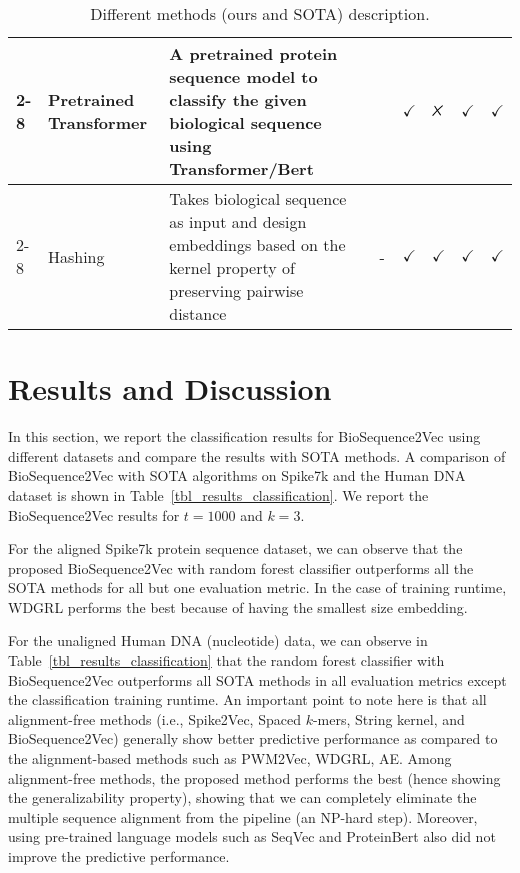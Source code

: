 \documentclass[runningheads]{llncs}
\newcommand{\tikzxmark}{%
\tikz[scale=0.23] {
    \draw[line width=0.7,line cap=round] (0,0) to [bend left=6] (1,1);
    \draw[line width=0.7,line cap=round] (0.2,0.95) to [bend right=3] (0.8,0.05);
}}
\begin{document}
\begin{table}[h!]
{\begin{tabular}{p{2.5cm}p{2cm}p{5cm}cp{1.6cm}p{2.5cm}p{1.2cm}p{1.7cm}}
    \cmidrule{2-8}
    \multirow{4}{*}{ProteinBERT} & \multirow{4}{2cm}{Pretrained Transformer} & A pretrained protein sequence model to classify the given biological sequence using Transformer/Bert & \multirow{4}{*}{~\cite{brandes2022proteinbert}} & \multirow{4}{*}{$\checkmark$} & \multirow{4}{*}{$\tikzxmark$} & \multirow{4}{*}{$\checkmark$}  & \multirow{4}{*}{$\checkmark$} \\
    \cmidrule{2-8}
    \multirow{4}{2cm}{BioSequence2Vec (ours)} & \multirow{4}{2cm}{Hashing} & Takes biological sequence as input and design embeddings based on the kernel property of preserving pairwise distance & \multirow{4}{*}{-} & \multirow{4}{*}{$\checkmark$} & \multirow{4}{*}{$\checkmark$} & \multirow{4}{*}{$\checkmark$}  & \multirow{4}{*}{$\checkmark$} \\
      \bottomrule
    \end{tabular}
    }
    \caption{Different methods (ours and SOTA) description.}
    \label{tbl_sota_detail}
\end{table}


\section{Results and Discussion}\label{sec_results}
In this section, we report the classification results for BioSequence2Vec using different datasets and compare the results with SOTA methods.
A comparison of BioSequence2Vec with SOTA algorithms on Spike7k and the Human DNA dataset is shown in Table~\ref{tbl_results_classification}. We report the BioSequence2Vec results for $t=1000$ and $k=3$.

For the aligned Spike7k protein sequence dataset, we can observe that the proposed BioSequence2Vec with random forest classifier outperforms all the SOTA methods for all but one evaluation metric. In the case of training runtime, WDGRL performs the best because of having the smallest size embedding. 


For the unaligned Human DNA (nucleotide) data, we can observe in Table~\ref{tbl_results_classification} that the random forest classifier with BioSequence2Vec outperforms all SOTA methods in all evaluation metrics except the classification training runtime. An important point to note here is that all alignment-free methods (i.e., Spike2Vec, Spaced $k$-mers, String kernel, and BioSequence2Vec) generally show better predictive performance as compared to the alignment-based methods such as PWM2Vec, WDGRL, AE. Among alignment-free methods, the proposed method performs the best (hence showing the generalizability property), showing that we can completely eliminate the multiple sequence alignment from the pipeline (an NP-hard step).
Moreover, using pre-trained language models such as SeqVec and ProteinBert also did not improve the predictive performance. 
\end{document}
